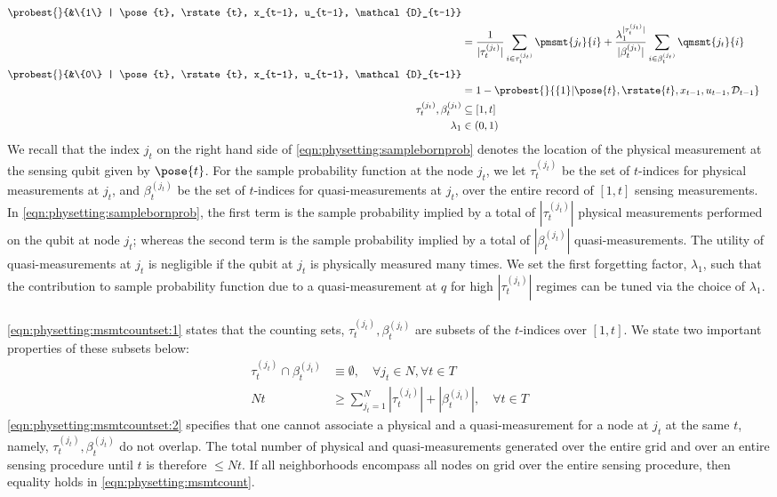 \begin{align}
\probest{}{&\{1\} | \pose{t}, \rstate{t}, x_{t-1}, u_{t-1}, \mathcal{D}_{t-1}} \nonumber \\ 
&=  \frac{1}{|\tau^{(j_t)}_t|}\sum_{i \in \tau^{(j_t)}_t} \pmsmt{j_t}{i} + \frac{\lambda_1^{|\tau^{(j_t)}_t|}}{|\beta^{(j_t)}_t|}\sum_{i \in \beta^{(j_t)}_t } \qmsmt{j_t}{i}  \label{eqn:physetting:samplebornprob} \\ 
\probest{}{&\{0\} | \pose{t}, \rstate{t}, x_{t-1}, u_{t-1}, \mathcal{D}_{t-1}} \nonumber \\
&= 1 - \probest{}{\{1\} | \pose{t}, \rstate{t}, x_{t-1}, u_{t-1}, \mathcal{D}_{t-1}} \\
\tau^{(j_t)}_t , \beta^{(j_t)}_t & \subseteq [1, t] \label{eqn:physetting:msmtcountset:1}  \\
\lambda_1 & \in (0,1) \label{eqn:physetting:forgettingfactor} 
\end{align} We recall that the index $j_t$  on the right hand side of \cref{eqn:physetting:samplebornprob} denotes the location of the physical measurement at the sensing qubit given by $\pose{t}$. For the sample probability function at the node $j_t$, we let $\tau^{(j_t)}_t $ be the set of $t$-indices for physical measurements at $j_t$, and $ \beta^{(j_t)}_t $ be the set of $t$-indices for quasi-measurements at $j_t$, over the entire record of $[1, t]$ sensing measurements. In \cref{eqn:physetting:samplebornprob}, the first term is the sample probability  implied by a total of $|\tau^{(j_t)}_t|$ physical measurements performed on the qubit at node $j_t$; whereas the second term is the sample probability  implied by a total of $|\beta^{(j_t)}_t|$ quasi-measurements. The utility of quasi-measurements at $j_t$ is negligible if the qubit at $j_t$ is physically measured many times. We set the first forgetting factor, $\lambda_1$, such that the contribution to sample probability function due to a quasi-measurement at $q$ for high $|\tau^{(j_t)}_t|$ regimes can be tuned via the choice of $\lambda_1$.  \\
\\
\cref{eqn:physetting:msmtcountset:1} states that the counting sets, $\tau^{(j_t)}_t, \beta^{(j_t)}_t$ are subsets of the $t$-indices over $[1,t]$. We state two important properties of these subsets below:
\begin{align}
\tau^{(j_t)}_t \cap \beta^{(j_t)}_t & \equiv \emptyset , \quad\forall j_t \in N, \forall t \in T \label{eqn:physetting:msmtcountset:2} \\
Nt & \geq \sum_{j_t=1}^{N} |\tau^{(j_t)}_t| + |\beta^{(j_t)}_t| , \quad \forall t \in T \label{eqn:physetting:msmtcount} 
\end{align} \cref{eqn:physetting:msmtcountset:2}  specifies that one cannot associate a physical and a quasi-measurement for a node at $j_t$ at the same $t$, namely,  $\tau^{(j_t)}_t, \beta^{(j_t)}_t$ do not overlap. The total number of physical and quasi-measurements generated over the entire grid and over an entire sensing procedure until $t$ is therefore $\leq Nt$. If all neighborhoods encompass all nodes on grid over the entire sensing procedure, then equality holds in \cref{eqn:physetting:msmtcount}. \\

